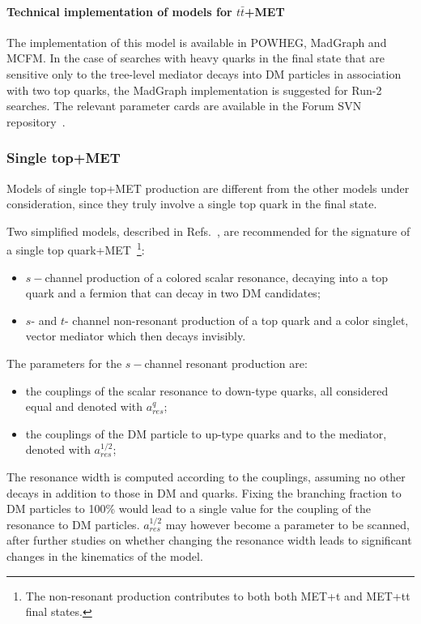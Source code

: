 \documentclass[a4,debug,notitlepage,nobib]{tufte-handout}
\begin{document}
\paragraph{Technical implementation of models for $t \bar{t}$+MET}

The implementation of this model is available in POWHEG, MadGraph
and MCFM. In the case of searches with heavy quarks in the final state
that are sensitive only to the tree-level mediator decays into DM particles
in association with two top quarks, the MadGraph implementation is suggested
for Run-2 searches. The relevant parameter cards are available in the Forum 
SVN repository~\cite{ForumSVN_DMTTBar}.


\subsubsection{Single top+MET}

Models of single top+MET production are different from the other models under consideration, 
since they truly involve a single top quark in the final state.

Two simplified models, described in Refs.~\cite{Andrea:2011ws,Boucheneb:2014wza}, are recommended 
for the signature of a single top quark+MET~\footnote{The non-resonant production 
contributes to both both MET+t and MET+tt final states.}:

\begin{itemize}
\item $s-$channel production of a colored scalar resonance, decaying into a top quark and a fermion
that can decay in two DM candidates;
\item $s$- and $t$- channel non-resonant production of a top quark and a color singlet, vector mediator which then decays invisibly.
\end{itemize}

The parameters for the $s-$channel resonant production are:
\begin{itemize}
 \item the couplings of the scalar resonance to down-type quarks, all considered equal and denoted with $a_{res}^q$;
 \item the couplings of the DM particle to up-type quarks and to the mediator, denoted with $a_{res}^{1/2}$;
\end{itemize}
The resonance width is computed according to the couplings, assuming no other decays in addition
to those in DM and quarks. Fixing the branching fraction to DM particles to 100\% would lead 
to a single value for the coupling of the resonance to DM particles. $a_{res}^{1/2}$ 
may however become a parameter to be scanned, after further studies on whether changing 
the resonance width leads to significant changes in the kinematics of the model. 
\end{document}
